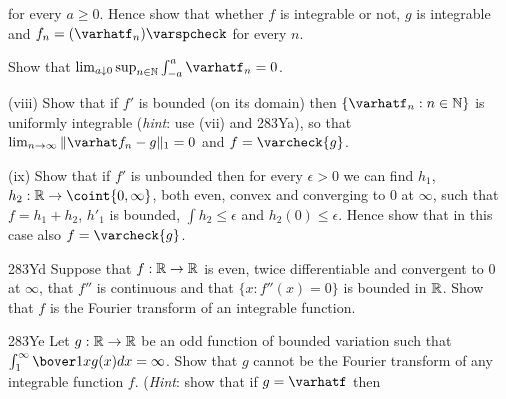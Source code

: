 {\noindent for every $a\ge 0$.   Hence show that whether $f$ is
integrable or not, $g$ is integrable and $f_n=(\varhatf_n)\varspcheck$
for every $n$.

 Show that
$\lim_{a\downarrow 0}\sup_{n\in\Bbb N}\int_{-a}^a\varhatf_n=0$.

\quad(viii) Show that if $f'$ is bounded (on its domain) then
$\{\varhatf_n:n\in\Bbb N\}$ is uniformly integrable ({\it hint\/}: use
(vii) and 283Ya), so that $\lim_{n\to\infty}\|\varhat f_n-g\|_1=0$ and
$f=\varcheck{g}$.

\quad(ix) Show that if $f'$ is unbounded then for every $\epsilon>0$ we
can find $h_1$, $h_2:\Bbb R\to\coint{0,\infty}$, both even, convex and
converging to $0$ at $\infty$, such that $f=h_1+h_2$, $h'_1$ is bounded,
$\int h_2\le\epsilon$ and $h_2(0)\le\epsilon$.   Hence show that in this
case also $f=\varcheck{g}$.

\spheader 283Yd Suppose that $f:\Bbb R\to\Bbb R$ is even,
twice differentiable and convergent to $0$ at $\infty$, that $f''$ is
continuous and that $\{x:f''(x)=0\}$
is bounded in $\Bbb R$.   Show that $f$ is the Fourier transform of an
integrable function.   

\spheader 283Ye Let $g:\Bbb R\to\Bbb R$ be an odd function of
bounded variation such that $\int_1^{\infty}\bover1xg(x)dx=\infty$.
Show that $g$ cannot be the Fourier transform of any integrable function
$f$.   ({\it Hint\/}:  show that if $g=\varhatf$ then

}%

